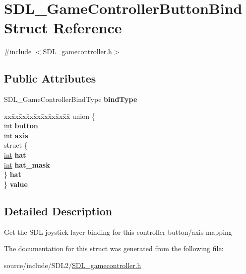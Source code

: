 \hypertarget{struct_s_d_l___game_controller_button_bind}{}\section{S\+D\+L\+\_\+\+Game\+Controller\+Button\+Bind Struct Reference}
\label{struct_s_d_l___game_controller_button_bind}


{\ttfamily \#include $<$S\+D\+L\+\_\+gamecontroller.\+h$>$}

\subsection*{Public Attributes}
\begin{DoxyCompactItemize}
\item 
\hypertarget{struct_s_d_l___game_controller_button_bind_a032fd941b0e8e5e2cdf52b7597f559b9}{}S\+D\+L\+\_\+\+Game\+Controller\+Bind\+Type {\bfseries bind\+Type}\label{struct_s_d_l___game_controller_button_bind_a032fd941b0e8e5e2cdf52b7597f559b9}

\item 
\hypertarget{struct_s_d_l___game_controller_button_bind_accdf80361d59602900aaa7ba14a52a4b}{}\begin{tabbing}
xx\=xx\=xx\=xx\=xx\=xx\=xx\=xx\=xx\=\kill
union \{\\
\>\hyperlink{_s_d_l__thread_8h_a6a64f9be4433e4de6e2f2f548cf3c08e}{int} {\bfseries button}\\
\>\hyperlink{_s_d_l__thread_8h_a6a64f9be4433e4de6e2f2f548cf3c08e}{int} {\bfseries axis}\\
\>struct \{\\
\>\>\hyperlink{_s_d_l__thread_8h_a6a64f9be4433e4de6e2f2f548cf3c08e}{int} {\bfseries hat}\\
\>\>\hyperlink{_s_d_l__thread_8h_a6a64f9be4433e4de6e2f2f548cf3c08e}{int} {\bfseries hat\_mask}\\
\>\} {\bfseries hat}\\
\} {\bfseries value}\label{struct_s_d_l___game_controller_button_bind_accdf80361d59602900aaa7ba14a52a4b}
\\

\end{tabbing}\end{DoxyCompactItemize}


\subsection{Detailed Description}
Get the S\+D\+L joystick layer binding for this controller button/axis mapping 

The documentation for this struct was generated from the following file\+:\begin{DoxyCompactItemize}
\item 
source/include/\+S\+D\+L2/\hyperlink{_s_d_l__gamecontroller_8h}{S\+D\+L\+\_\+gamecontroller.\+h}\end{DoxyCompactItemize}
